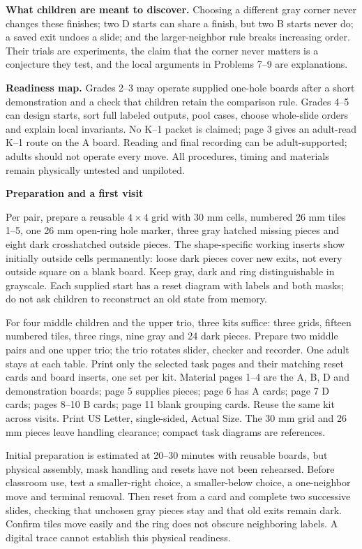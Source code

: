 \documentclass[11pt]{article}
\newcommand{\heading}[1]{\par\textbf{#1}\par}
\begin{document}
\textbf{What children are meant to discover.} Choosing a different gray corner never changes these finishes; two D starts can share a finish, but two B starts never do; a saved exit undoes a slide; and the larger-neighbor rule breaks increasing order. Their trials are experiments, the claim that the corner never matters is a conjecture they test, and the local arguments in Problems 7--9 are explanations.

\textbf{Readiness map.} Grades 2--3 may operate supplied one-hole boards after a short demonstration and a check that children retain the comparison rule. Grades 4--5 can design starts, sort full labeled outputs, pool cases, choose whole-slide orders and explain local invariants. No K--1 packet is claimed; page 3 gives an adult-read K--1 route on the A board. Reading and final recording can be adult-supported; adults should not operate every move. All procedures, timing and materials remain physically untested and unpiloted.
\newpage
\heading{Preparation and a first visit}
Per pair, prepare a reusable $4\times 4$ grid with 30 mm cells, numbered 26 mm tiles 1--5, one 26 mm open-ring hole marker, three gray hatched missing pieces and eight dark crosshatched outside pieces. The shape-specific working inserts show initially outside cells permanently: loose dark pieces cover new exits, not every outside square on a blank board. Keep gray, dark and ring distinguishable in grayscale. Each supplied start has a reset diagram with labels and both masks; do not ask children to reconstruct an old state from memory.

For four middle children and the upper trio, three kits suffice: three grids, fifteen numbered tiles, three rings, nine gray and 24 dark pieces. Prepare two middle pairs and one upper trio; the trio rotates slider, checker and recorder. One adult stays at each table. Print only the selected task pages and their matching reset cards and board inserts, one set per kit. Material pages 1--4 are the A, B, D and demonstration boards; page 5 supplies pieces; page 6 has A cards; page 7 D cards; pages 8--10 B cards; page 11 blank grouping cards. Reuse the same kit across visits. Print US Letter, single-sided, Actual Size. The 30 mm grid and 26 mm pieces leave handling clearance; compact task diagrams are references.

Initial preparation is estimated at 20--30 minutes with reusable boards, but physical assembly, mask handling and resets have not been rehearsed. Before classroom use, test a smaller-right choice, a smaller-below choice, a one-neighbor move and terminal removal. Then reset from a card and complete two successive slides, checking that unchosen gray pieces stay and that old exits remain dark. Confirm tiles move easily and the ring does not obscure neighboring labels. A digital trace cannot establish this physical readiness.
\end{document}
